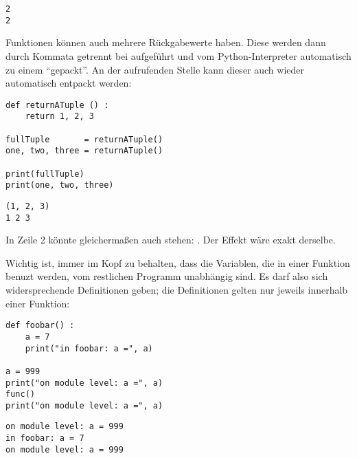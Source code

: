 \begin{cmdbox}
\begin{verbatim}
2
2
\end{verbatim}
\end{cmdbox}

Funktionen können auch mehrere Rückgabewerte haben. Diese werden dann durch Kommata getrennt bei  aufgeführt und vom Python-Interpreter automatisch zu einem  \enquote{gepackt}. An der aufrufenden Stelle kann dieser  auch wieder automatisch entpackt werden:
\begin{codebox}
\begin{verbatim}
def returnATuple () :
    return 1, 2, 3

fullTuple       = returnATuple()
one, two, three = returnATuple()

print(fullTuple)
print(one, two, three)
\end{verbatim}
\end{codebox}

\begin{cmdbox}
\begin{verbatim}
(1, 2, 3)
1 2 3
\end{verbatim}
\end{cmdbox}

In Zeile 2 könnte gleichermaßen auch stehen: . Der Effekt wäre exakt derselbe.

Wichtig ist, immer im Kopf zu behalten, dass die Variablen, die in einer Funktion benuzt werden, vom restlichen Programm unabhängig sind. Es darf also sich widersprechende Definitionen geben; die Definitionen gelten nur jeweils innerhalb einer Funktion:

\begin{codebox}
\begin{verbatim}
def foobar() :
    a = 7
    print("in foobar: a =", a)

a = 999
print("on module level: a =", a)
func()
print("on module level: a =", a)
\end{verbatim}
\end{codebox}

\begin{cmdbox}
\begin{verbatim}
on module level: a = 999
in foobar: a = 7
on module level: a = 999
\end{verbatim}
\end{cmdbox}


